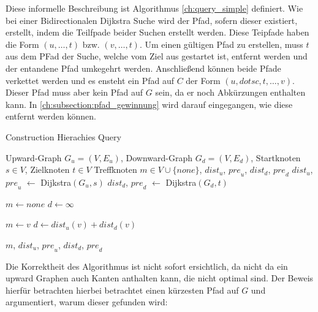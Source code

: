 Diese informelle Beschreibung ist Algorithmus \ref{ch:query_simple} definiert.
Wie bei einer Bidirectionalen Dijkstra Suche wird der Pfad, sofern dieser existiert, erstellt, indem die Teilfpade beider Suchen erstellt werden.
Diese Teipfade haben die Form $(u, \dotsc, t)$ bzw. $(v, \dotsc, t)$.
Um einen gültigen Pfad zu erstellen, muss $t$ aus dem PFad der Suche, welche vom Ziel aus gestartet ist, entfernt werden und der entandene Pfad umkegehrt werden.
Anschließend können beide Pfade verkettet werden und es ensteht ein Pfad auf $C$ der Form $(u, dotsc, t, \dotsc, v)$.
Dieser Pfad muss aber kein Pfad auf $G$ sein, da er noch Abkürzungen enthalten kann.
In \autoref{ch:subsection:pfad_gewinnung} wird darauf eingegangen, wie diese entfernt werden können.

\begin{algorithm}[ht]
    \caption{Construction Hierachies Query}
    \begin{algorithmic}[1]
        \Require Upward-Graph $G_u = (V, E_u)$, Downward-Graph $G_d = (V, E_d)$, Startknoten $s \in V$, Zielknoten $t \in V$
        \Ensure Treffknoten $m \in V \cup \{ {none} \}$, ${dist}_u$, ${pre}_u$, ${dist}_d$, ${pre}_d$
        \State ${dist}_u$, ${pre}_u$ $\leftarrow$ Dijkstra$(G_u, s)$
        \State ${dist}_d$, ${pre}_d$ $\leftarrow$ Dijkstra$(G_d, t)$

        \State
        \State $m \leftarrow {none}$
        \State $d \leftarrow \infty$
        \State

        \State $m \leftarrow v$
        \State $d \leftarrow {dist}_u(v) + {dist}_d(v)$
        \EndIf
        \EndFor

        \State
        \State \Return $m$, ${dist}_u$, ${pre}_u$, ${dist}_d$, ${pre}_d$
    \end{algorithmic}
    \label{ch:query_simple}
\end{algorithm}

Die Korrektheit des Algorithmus ist nicht sofort ersichtlich, da nicht da ein upward Graphen auch Kanten anthalten kann, die nicht optimal sind.
Der Beweis hierfür betrachten hierbei betrachtet einen kürzesten Pfad auf $G$ und argumentiert, warum dieser gefunden wird:

